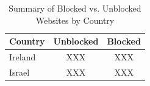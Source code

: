 \begin{table}
\centering
\caption{Summary of Blocked vs. Unblocked Websites by Country}
\begin{tabular}{lcc}
\toprule
\textbf{Country} & \textbf{Unblocked} & \textbf{Blocked} \\
\midrule
Ireland & XXX & XXX \\
Israel    & XXX & XXX \\   
\bottomrule
\end{tabular}
\label{tab:blocked_summary}
\end{table}